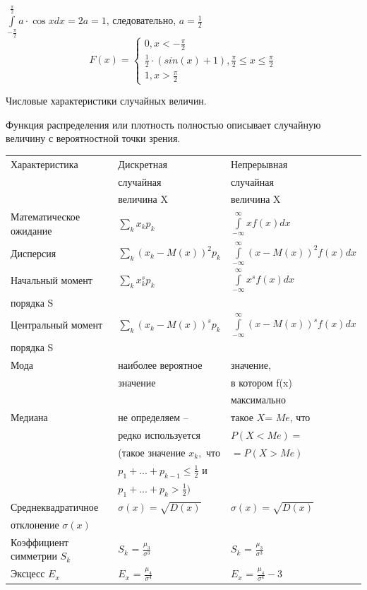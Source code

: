 \documentclass[russian, 12pt, fleqn]{article}
\begin{document}
$  \int\limits_{-\frac{\pi}{2}}^{\frac{\pi}{2}}a\cdot \cos x dx = 2a = 1$, следовательно, $a = \frac{1}{2}$\\
\begin{equation*} 
F(x)=
 \begin{cases}
   0 , x < -\frac{\pi}{2}\\
   \frac{1}{2} \cdot (sin(x) + 1) , \frac{\pi}{2} \leq x \leq \frac{\pi}{2} \\
   1 ,  x > \frac{\pi}{2}
 \end{cases}
\end{equation*}
\begin{center}
$\textbf{Числовые характеристики случайных величин. }$\\
\end{center}
Функция распределения или плотность полностью описывает случайную величину с вероятностной точки зрения.\\
\begin{tabular}[b]{ | l | l | l | }
\hline
Характеристика &  Дискретная & Непрерывная   \\
 &  случайная  & случайная  \\
 &  величина X  & величина X  \\
\hline
Математическое ожидание &  $ \sum\limits_{k} x_kp_k$ & $\int\limits_{-\infty}^{\infty}xf(x)dx$\\
Дисперсия & $\sum\limits_{k}^{}(x_k-M(x))^2p_k$ & $\int\limits_{-\infty}^{\infty}(x- M(x))^2f(x)dx$\\
Начальный момент & $\sum\limits_{k} x^s_kp_k$ & $\int\limits_{-\infty}^{\infty}x^sf(x)dx$\\
порядка S& &\\
Центральный момент& $\sum\limits_{k}^{}(x_k-M(x))^sp_k$& $\int\limits_{-\infty}^{\infty}(x- M(x))^sf(x)dx$\\
порядка S& &\\
Мода&наиболее вероятное&значение, \\
& значение& в котором f(x)\\
& &максимально\\
Медиана&не определяем -- &такое $X$= $Me$, что \\
&редко используется&$P(X < Me)=$\\
&(такое значение $x_k,$ что &  $=P(X > Me)$\\
& $p_1+ ...+p_{k - 1} \leq \frac{1}{2}$ и&\\
& $p_1+ ...+p_{k} > \frac{1}{2})$ & \\
Среднеквадратичное  & $\sigma(x) = \sqrt{D(x)}$ & $\sigma(x) = \sqrt{D(x)}$\\
отклонение $\sigma(x)$ & &\\
Коэффициент симметрии $S_k$ & $S_k$ = $\frac{\mu_3}{\sigma^3}$ &  $S_k$ = $\frac{\mu_3}{\sigma^3}$ \\
Эксцесс $E_x$ & $E_x$ = $\frac{\mu_4}{\sigma^4}$ & $E_x$ = $\frac{\mu_4}{\sigma^4} - 3$\\
\hline
\end{tabular}\\
\end{document}
